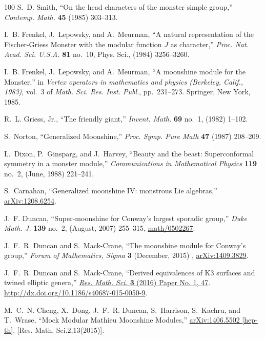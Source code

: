 \begin{thebibliography}{100}
S.~D. Smith, ``On the head characters of the monster simple group,'' {\em
  Contemp. Math.} {\bfseries 45} (1985) 303--313.

I.~B. Frenkel, J.~Lepowsky, and A.~Meurman, ``A natural representation of the
  {F}ischer-{G}riess {M}onster with the modular function {$J$} as character,''
  {\em Proc. Nat. Acad. Sci. U.S.A.} {\bfseries 81} no.~10, Phys. Sci., (1984)
  3256--3260.

I.~B. Frenkel, J.~Lepowsky, and A.~Meurman, ``A moonshine module for the
  {M}onster,'' in {\em Vertex operators in mathematics and physics (Berkeley,
  Calif., 1983)}, vol.~3 of {\em Math. Sci. Res. Inst. Publ.}, pp.~231--273.
\newblock Springer, New York, 1985.

R.~L. Griess, Jr., ``The friendly giant,'' {\em Invent. Math.} {\bfseries 69}
  no.~1, (1982) 1--102.

S.~Norton, ``{Generalized Moonshine},'' {\em Proc. Symp. Pure Math} {\bfseries
  47} (1987) 208--209.

L.~Dixon, P.~Ginsparg, and J.~Harvey, ``Beauty and the beast: Superconformal
  symmetry in a monster module,'' {\em Communications in Mathematical Physics}
  {\bfseries 119} no.~2, (June, 1988) 221--241.

S.~Carnahan, ``{Generalized moonshine IV: monstrous Lie algebras},''
  \href{http://arxiv.org/abs/arXiv:1208.6254}{{\ttfamily arXiv:1208.6254}}.

J.~F. Duncan, ``{Super-moonshine for Conway's largest sporadic group},'' {\em
  Duke Math. J.} {\bfseries 139} no.~2, (August, 2007) 255--315,
  \href{http://arxiv.org/abs/math/0502267}{{\ttfamily math/0502267}}.

J.~F.~R. Duncan and S.~Mack-Crane, ``{The moonshine module for Conway's
  group},'' {\em Forum of Mathematics, Sigma} {\bfseries 3} (December, 2015) ,
  \href{http://arxiv.org/abs/arXiv:1409.3829}{{\ttfamily arXiv:1409.3829}}.

J.~F.~R. Duncan and S.~Mack-Crane, ``Derived equivalences of {K}3 surfaces and
  twined elliptic genera,''
  \href{http://dx.doi.org/10.1186/s40687-015-0050-9}{{\em Res. Math. Sci.}
  {\bfseries 3} (2016) Paper No. 1, 47}.
  \url{http://dx.doi.org/10.1186/s40687-015-0050-9}.

M.~C.~N. Cheng, X.~Dong, J.~F.~R. Duncan, S.~Harrison, S.~Kachru, and T.~Wrase,
  ``{Mock Modular Mathieu Moonshine Modules},''
  \href{http://arxiv.org/abs/1406.5502}{{\ttfamily arXiv:1406.5502 [hep-th]}}.
[Res. Math. Sci.2,13(2015)].


\end{thebibliography}
